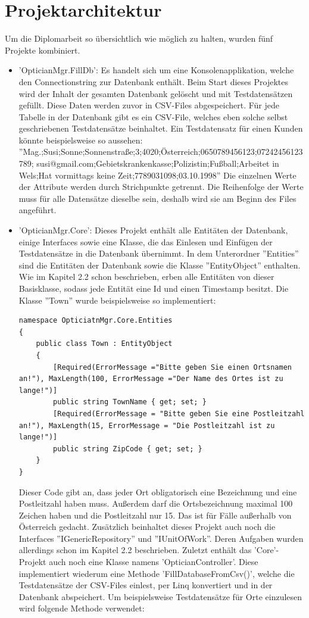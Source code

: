 \section{Projektarchitektur}
Um die Diplomarbeit so übersichtlich wie möglich zu halten, wurden fünf Projekte kombiniert.
\begin{itemize}
\item 'OpticianMgr.FillDb': Es handelt sich um eine Konsolenapplikation, welche den Connectionstring zur Datenbank enthält. Beim Start dieses Projektes wird der Inhalt der gesamten Datenbank gelöscht und mit Testdatensätzen gefüllt. Diese Daten werden zuvor in CSV-Files abgespeichert. Für jede Tabelle in der Datenbank gibt es ein CSV-File, welches eben solche selbst geschriebenen Testdatensätze beinhaltet. Ein Testdatensatz für einen Kunden könnte beispielsweise so aussehen: \newline ''Mag.;Susi;Sonne;Sonnenstraße;3;4020;Österreich;0650789456123;07242456123789; susi@gmail.com;Gebietskrankenkasse;Polizistin;Fußball;Arbeitet in Wels;Hat vormittags keine Zeit;7789031098;03.10.1998'' \newline Die einzelnen Werte der Attribute werden durch Strichpunkte getrennt. Die Reihenfolge der Werte muss für alle Datensätze dieselbe sein, deshalb wird sie am Beginn des Files angeführt.
\item 'OpticianMgr.Core': Dieses Projekt enthält alle Entitäten der Datenbank, einige Interfaces sowie eine Klasse, die das Einlesen und Einfügen der Testdatensätze in die Datenbank übernimmt. \newline In dem Unterordner ''Entities'' sind die Entitäten der Datenbank sowie die Klasse ''EntityObject'' enthalten. Wie im Kapitel 2.2 schon beschrieben, erben alle Entitäten von dieser Basisklasse, sodass jede Entität eine Id und einen Timestamp besitzt. Die Klasse ''Town'' wurde beispielsweise so implementiert:
\begin{lstlisting}
namespace OpticiatnMgr.Core.Entities
{
    public class Town : EntityObject
    {
        [Required(ErrorMessage ="Bitte geben Sie einen Ortsnamen an!"), MaxLength(100, ErrorMessage ="Der Name des Ortes ist zu lange!")]
        public string TownName { get; set; }
        [Required(ErrorMessage = "Bitte geben Sie eine Postleitzahl an!"), MaxLength(15, ErrorMessage = "Die Postleitzahl ist zu lange!")]
        public string ZipCode { get; set; }
    }
}
\end{lstlisting}
Dieser Code gibt an, dass jeder Ort obligatorisch eine Bezeichnung und eine Postleitzahl haben muss. Außerdem darf die Ortsbezeichnung maximal 100 Zeichen haben und die Postleitzahl nur 15. Das ist für Fälle außerhalb von Österreich gedacht. \newline Zusätzlich beinhaltet dieses Projekt auch noch die Interfaces ''IGenericRepository'' und ''IUnitOfWork''. Deren Aufgaben wurden allerdings schon im Kapitel 2.2 beschrieben. \newline Zuletzt enthält das 'Core'-Projekt auch noch eine Klasse namens 'OpticianController'. Diese implementiert wiederum eine Methode 'FillDatabaseFromCsv()', welche die Testdatensätze der CSV-Files einlest, per Linq konvertiert und in der Datenbank abspeichert. Um beispielsweise Testdatensätze für Orte einzulesen wird folgende Methode verwendet: 

\end{itemize}
